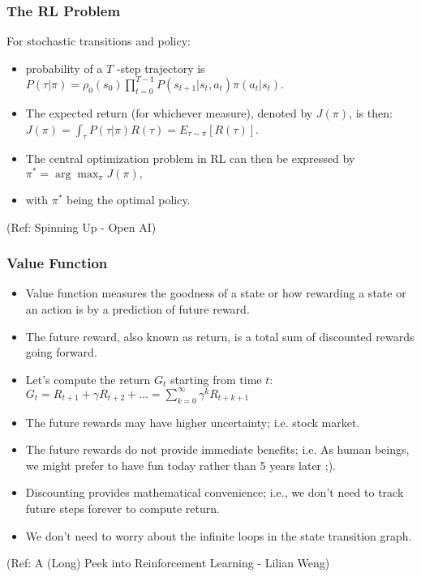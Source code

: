 \begin{frame}[fragile]\frametitle{The RL Problem}

For stochastic transitions and policy:

\begin{itemize}
\item probability of a $T$ -step trajectory is $P(\tau|\pi) = \rho_0 (s_0) \prod_{t=0}^{T-1} P(s_{t+1} | s_t, a_t) \pi(a_t | s_t).$
\item The expected return (for whichever measure), denoted by $J(\pi)$, is then: $J(\pi) = \int_{\tau} P(\tau|\pi) R(\tau) = E_{\tau\sim \pi}[R(\tau)]$.
\item The central optimization problem in RL can then be expressed by $\pi^* = \arg \max_{\pi} J(\pi),$
\item with $\pi^*$ being the optimal policy.
\end{itemize}

{\tiny (Ref: Spinning Up - Open AI)}
\end{frame}


\begin{frame}[fragile]\frametitle{Value Function}


\begin{itemize}
\item Value function measures the goodness of a state or how rewarding a state or an action is by a
prediction of future reward. 
\item The future reward, also known as return, is a total sum of discounted rewards going forward. 
\item Let’s compute the return $G_t$ starting from time $t$: $G_t = R_{t+1} + \gamma R_{t+2} + \ldots = \sum_{k=0}^{\infty} \gamma^kR_{t+k+1}$
\item The future rewards may have higher uncertainty; i.e. stock market.
\item The future rewards do not provide immediate benefits; i.e. As human beings, we might prefer to
have fun today rather than 5 years later ;).
\item Discounting provides mathematical convenience; i.e., we don’t need to track future steps forever to
compute return.
\item We don’t need to worry about the infinite loops in the state transition graph.
\end{itemize}

{\tiny (Ref: A (Long) Peek into Reinforcement Learning - Lilian Weng)}
\end{frame}

